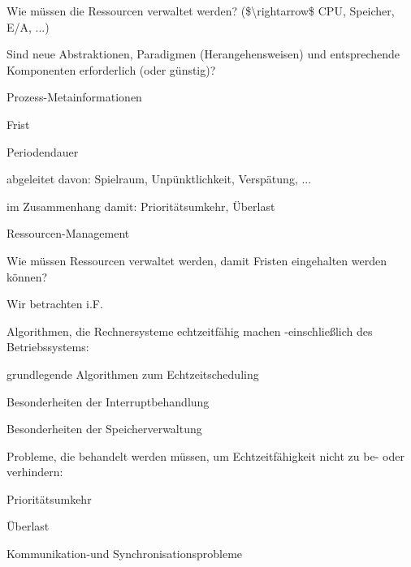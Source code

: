 \documentclass[a4paper]{article}
\begin{document}
\begin{multicols}{3}
\begin{itemize*}
\begin{enumerate*}
            \item Wie müssen die Ressourcen verwaltet werden? (\$\textbackslash rightarrow\$ CPU, Speicher, E/A, ...)
            \item Sind neue Abstraktionen, Paradigmen (Herangehensweisen) und entsprechende Komponenten erforderlich (oder günstig)?
        \end{enumerate*}
        \item
        Prozess-Metainformationen
        \begin{enumerate*}

            \item Frist
            \item Periodendauer
            \item abgeleitet davon: Spielraum, Unpünktlichkeit, Verspätung, ...
            \item im Zusammenhang damit: Prioritätsumkehr, Überlast
        \end{enumerate*}
        \item
        Ressourcen-Management
        \begin{itemize*}
            \item Wie müssen Ressourcen verwaltet werden, damit Fristen eingehalten werden können?
        \end{itemize*}
    \end{itemize*}

    Wir betrachten i.F.

    \begin{enumerate*}
        \item
        Algorithmen, die Rechnersysteme echtzeitfähig machen -einschließlich
        des Betriebssystems:
        \begin{itemize*}
            \item grundlegende Algorithmen zum Echtzeitscheduling
            \item Besonderheiten der Interruptbehandlung
            \item Besonderheiten der Speicherverwaltung
        \end{itemize*}
        \item
        Probleme, die behandelt werden müssen, um Echtzeitfähigkeit nicht zu
        be- oder verhindern:
        \begin{itemize*}
            \item Prioritätsumkehr
            \item Überlast
            \item Kommunikation-und Synchronisationsprobleme
        \end{itemize*}
    \end{enumerate*}



\end{multicols}
\end{document}
